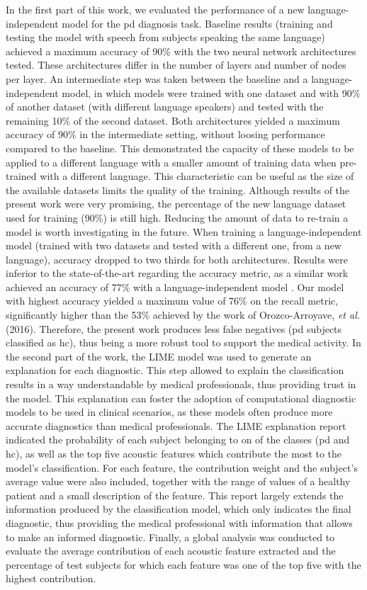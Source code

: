 In the first part of this work, we evaluated the performance of a new language-independent model for the \gls{pd} diagnosis task. Baseline results (training and testing the model with speech from subjects speaking the same language) achieved a maximum accuracy of 90\% with the two neural network architectures tested. These architectures differ in the number of layers and number of nodes per layer. An intermediate step was taken between the baseline and a language-independent model, in which models were trained with one dataset and with 90\% of another dataset (with different language speakers) and tested with the remaining 10\% of the second dataset. Both architectures yielded a maximum accuracy of 90\% in the intermediate setting, without loosing performance compared to the baseline. This demonstrated the capacity of these models to be applied to a different language with a smaller amount of training data when pre-trained with a different language. This characteristic can be useful as the size of the available datasets limits the quality of the training. Although results of the present work were very promising, the percentage of the new language dataset used for training (90\%) is still high. Reducing the amount of data to re-train a model is worth investigating in the future. When training a language-independent model (trained with two datasets and tested with a different one, from a new language), accuracy dropped to two thirds for both architectures. Results were inferior to the state-of-the-art regarding the accuracy metric, as a similar work achieved an accuracy of 77\% with a language-independent model \cite{parkinson_three_languages}. Our model with highest accuracy yielded a maximum value of 76\% on the recall metric, significantly higher than the 53\% achieved by the work of Orozco-Arroyave, \textit{et al.} (2016). Therefore, the present work produces less false negatives (\gls{pd} subjects classified as \gls{hc}), thus being a more robust tool to support the medical activity. In the second part of the work, the LIME model was used to generate an explanation for each diagnostic. This step allowed to explain the classification results in a way understandable by medical professionals, thus providing trust in the model. This explanation can foster the adoption of computational diagnostic models to be used in clinical scenarios, as these models often produce more accurate diagnostics than medical professionals. The LIME explanation report indicated the probability of each subject belonging to on of the classes (\gls{pd} and \gls{hc}), as well as the top five acoustic features which contribute the most to the model's classification. For each feature, the contribution weight and the subject's average value were also included, together with the range of values of a healthy patient and a small description of the feature. This report largely extends the information produced by the classification model, which only indicates the final diagnostic, thus providing the medical professional with information that allows to make an informed diagnostic. Finally, a global analysis was conducted to evaluate the average contribution of each acoustic feature extracted and the percentage of test subjects for which each feature was one of the top five with the highest contribution. 